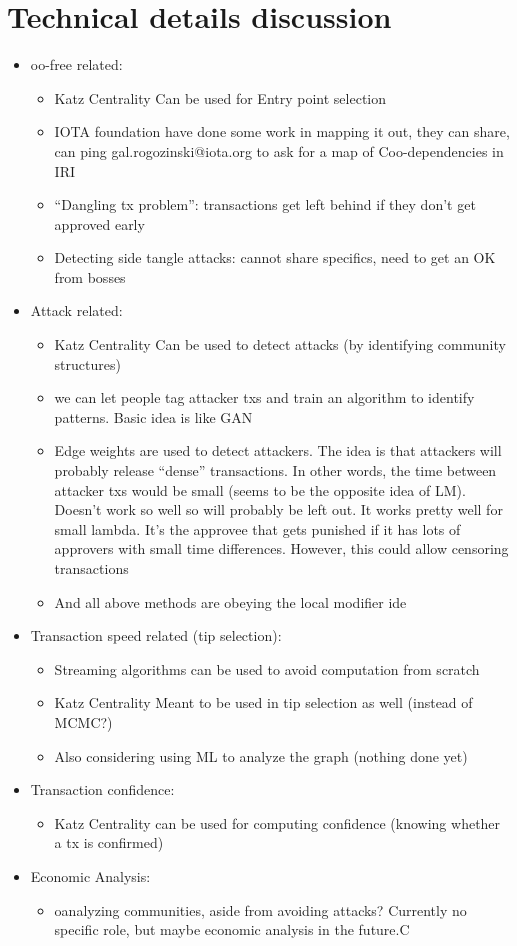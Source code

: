 \documentclass{article}
\begin{document}
\section{Technical details discussion}
\begin{itemize}
	\item oo-free related:
	\begin{itemize}
		\item Katz Centrality Can be used for Entry point selection
		\item IOTA foundation have done some work in mapping it out, they can share, can ping gal.rogozinski@iota.org to ask for a map of Coo-dependencies in IRI
		\item “Dangling tx problem”: transactions get left behind if they don’t get approved early
		\item Detecting side tangle attacks: cannot share specifics, need to get an OK from bosses
	\end{itemize}
	\item Attack related: 
	\begin{itemize}
		\item Katz Centrality Can be used to detect attacks (by identifying community structures)
		\item we can let people tag attacker txs and train an algorithm to identify patterns. Basic idea is like GAN
		\item Edge weights are used to detect attackers. The idea is that attackers will probably release “dense” transactions. In other words, the time between attacker txs would be small (seems to be the opposite idea of LM). Doesn’t work so well so will probably be left out. It works pretty well for small lambda. It’s the approvee that gets punished if it has lots of approvers with small time differences. However, this could allow censoring transactions
		\item And all above methods are obeying the local modifier ide
	\end{itemize}
	\item Transaction speed related (tip selection):
	\begin{itemize}
		\item Streaming algorithms can be used to avoid computation from scratch
		\item Katz Centrality Meant to be used in tip selection as well (instead of MCMC?)
		\item Also considering using ML to analyze the graph (nothing done yet)
	\end{itemize}
		\item Transaction confidence:
	\begin{itemize}
		\item Katz Centrality can be used for computing confidence (knowing whether a tx is confirmed)
	\end{itemize}
		\item Economic Analysis:
	\begin{itemize}
		\item oanalyzing communities, aside from avoiding attacks? Currently no specific role, but maybe economic analysis in the future.C
	\end{itemize}
\end{itemize}
\end{document}
